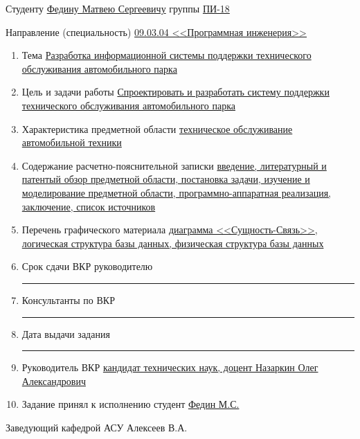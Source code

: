 {
    \setlength{\parindent}{0pt}
    Студенту \uline{Федину Матвею Сергеевичу} группы \uline{ПИ-18}

    Направление (специальность)
    \uline{09.03.04 <<Программная инженерия>>}

    \begin{enumerate}
        \item Тема \uline{Разработка информационной системы
        поддержки технического обслуживания автомобильного парка\hfill}

        \item Цель и задачи работы \uline{Спроектировать и разработать
        систему поддержки технического обслуживания автомобильного парка\hfill}

        \item Характеристика предметной области \uline{техническое
        обслуживание автомобильной техники\hfill}

        \item Содержание расчетно-пояснительной записки \uline{
            введение, литературный и патентый обзор предметной области,
            постановка задачи, изучение и моделирование предметной области,
            программно-аппаратная реализация, заключение, список источников\hfill
        }

        \item Перечень графического материала \uline{
            диаграмма <<Сущность-Связь>>, логическая структура базы данных,
            физическая структура базы данных\hfill
        }

        \item Срок сдачи ВКР руководителю \uline{\hfill}\\
        \rule{\textwidth}{0.5pt}

        \item Консультанты по ВКР \uline{\hfill}\\
        \rule{\textwidth}{0.5pt}

        \item Дата выдачи задания \uline{\hfill}\\
        \rule{\textwidth}{0.5pt}

        \item Руководитель ВКР \uline{
            кандидат технических наук, доцент Назаркин Олег Александрович\hfill
        }

        \item Задание принял к исполнению студент \uline{
            Федин М.С.\hfill
        }
    \end{enumerate}

    Заведующий кафедрой АСУ Алексеев В.А. \uline{\hfill}

}
